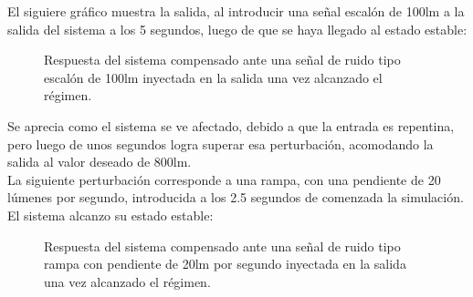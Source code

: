 \documentclass[a4paper,11pt]{article}
\begin{document}
El siguiere gráfico muestra la salida, al introducir una señal escalón de 100lm a la salida del sistema a los 5 segundos, luego de que se haya llegado al estado estable:\\

	  \begin{figure}[H] %
	\caption{Respuesta del sistema compensado ante una señal de ruido tipo escalón de 100lm inyectada en la salida una vez alcanzado el régimen.}
	\label{fig:FTlazoc_comp_step+pert_escalon}
	\end{figure} 

Se aprecia como el sistema se ve afectado, debido a que la entrada es repentina, pero luego de unos segundos logra superar esa perturbación, acomodando la salida al valor deseado de 800lm.\\
La siguiente perturbación corresponde a una rampa, con una pendiente de 20 lúmenes por segundo, introducida a los 2.5 segundos de comenzada la simulación. El sistema alcanzo su estado estable:\\

	  \begin{figure}[H] %
	\caption{Respuesta del sistema compensado ante una señal de ruido tipo rampa con pendiente de 20lm por segundo inyectada en la salida una vez alcanzado el régimen.}
	\label{fig:FTlazoc_comp_step+pert_ramp}
	\end{figure} 
\end{document}
